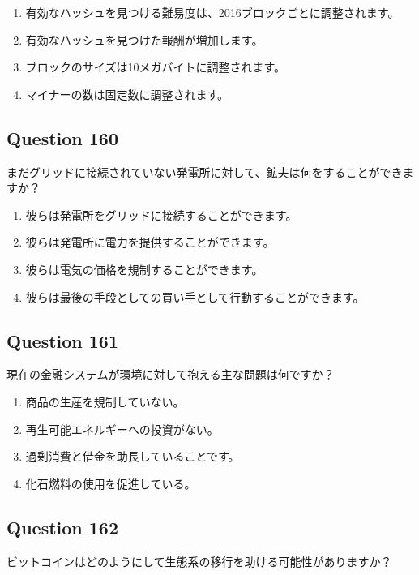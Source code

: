 \documentclass[12pt,a4paper]{article}
\begin{document}
\begin{enumerate}[label=\Alph*., leftmargin=*]
\item 有効なハッシュを見つける難易度は、2016ブロックごとに調整されます。
\item 有効なハッシュを見つけた報酬が増加します。
\item ブロックのサイズは10メガバイトに調整されます。
\item マイナーの数は固定数に調整されます。
\end{enumerate}

\bigskip


\subsection*{Question 160}
まだグリッドに接続されていない発電所に対して、鉱夫は何をすることができますか？

\begin{enumerate}[label=\Alph*., leftmargin=*]
\item 彼らは発電所をグリッドに接続することができます。
\item 彼らは発電所に電力を提供することができます。
\item 彼らは電気の価格を規制することができます。
\item 彼らは最後の手段としての買い手として行動することができます。
\end{enumerate}

\bigskip


\subsection*{Question 161}
現在の金融システムが環境に対して抱える主な問題は何ですか？

\begin{enumerate}[label=\Alph*., leftmargin=*]
\item 商品の生産を規制していない。
\item 再生可能エネルギーへの投資がない。
\item 過剰消費と借金を助長していることです。
\item 化石燃料の使用を促進している。
\end{enumerate}

\bigskip


\subsection*{Question 162}
ビットコインはどのようにして生態系の移行を助ける可能性がありますか？
\end{document}
